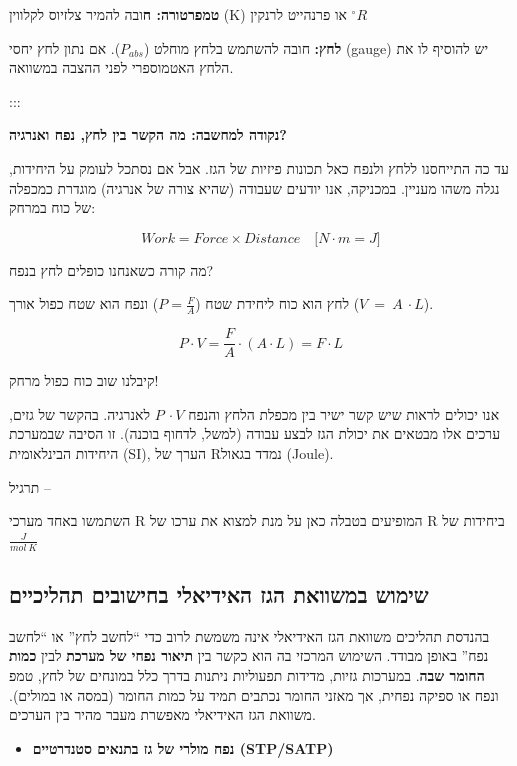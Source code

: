 \documentclass[
  hebrew,
  letterpaper,
  DIV=11,
  numbers=noendperiod]{scrreprt}
\providecommand{\tightlist}{%
  \setlength{\itemsep}{0pt}\setlength{\parskip}{0pt}}
\begin{document}
\textbf{טמפרטורה: ח}ובה להמיר צלזיוס לקלווין (K) או פרנהייט לרנקין
\({^\circ}R\)

\textbf{לחץ:} חובה להשתמש בלחץ מוחלט (\(P_{abs}\)). אם נתון לחץ יחסי
(gauge) יש להוסיף לו את הלחץ האטמוספרי לפני ההצבה במשוואה.

:::

\textbf{נקודה למחשבה: מה הקשר בין לחץ, נפח ואנרגיה?}

עד כה התייחסנו ללחץ ולנפח כאל תכונות פיזיות של הגז. אבל אם נסתכל לעומק
על היחידות, נגלה משהו מעניין. במכניקה, אנו יודעים שעבודה (שהיא צורה של
אנרגיה) מוגדרת כמכפלה של כוח במרחק:

\[Work = Force \times Distance\quad\lbrack N \cdot m = J\rbrack\]

מה קורה כשאנחנו כופלים לחץ בנפח?

לחץ הוא כוח ליחידת שטח (\(P = \frac{F}{A}\)) ונפח הוא שטח כפול אורך
(\(V\  = \ A\  \cdot L\)).

\[P \cdot V = \frac{F}{A} \cdot (A \cdot L) = F \cdot L\]

קיבלנו שוב כוח כפול מרחק!

אנו יכולים לראות שיש קשר ישיר בין מכפלת הלחץ והנפח \(P\  \cdot V\)
לאנרגיה. בהקשר של גזים, ערכים אלו מבטאים את יכולת הגז לבצע עבודה (למשל,
לדחוף בוכנה). זו הסיבה שבמערכת היחידות הבינלאומית (SI), הערך של Rנמדד
בג\textquotesingle אול (Joule).

תרגיל --

השתמשו באחד מערכי R המופיעים בטבלה כאן על מנת למצוא את ערכו של R ביחידות
של \(\frac{J}{mol\ K}\)

\subsection{שימוש במשוואת הגז האידיאלי בחישובים
תהליכיים}\label{ux5e9ux5d9ux5deux5d5ux5e9-ux5d1ux5deux5e9ux5d5ux5d5ux5d0ux5ea-ux5d4ux5d2ux5d6-ux5d4ux5d0ux5d9ux5d3ux5d9ux5d0ux5dcux5d9-ux5d1ux5d7ux5d9ux5e9ux5d5ux5d1ux5d9ux5dd-ux5eaux5d4ux5dcux5d9ux5dbux5d9ux5d9ux5dd}

בהנדסת תהליכים משוואת הגז האידיאלי אינה משמשת לרוב כדי ``לחשב לחץ'' או
``לחשב נפח'' באופן מבודד. השימוש המרכזי בה הוא כקשר בין \textbf{תיאור
נפחי של מערכת} לבין \textbf{כמות החומר שבה}. במערכות גזיות, מדידות
תפעוליות ניתנות בדרך כלל במונחים של לחץ, טמפ\textquotesingle{} ונפח או
ספיקה נפחית, אך מאזני החומר נכתבים תמיד על כמות החומר (במסה או במולים).
משוואת הגז האידיאלי מאפשרת מעבר מהיר בין הערכים.

\begin{itemize}
\tightlist
\item
  \textbf{נפח מולרי של גז בתנאים סטנדרטיים (STP/SATP)}
\end{itemize}
\end{document}
